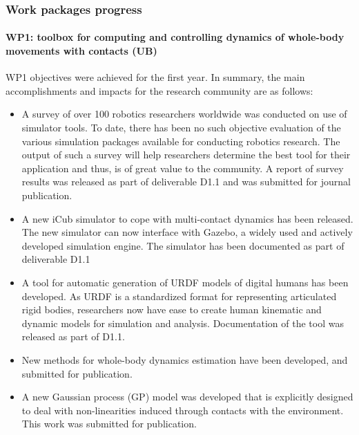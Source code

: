 \documentclass[12pt,a4paper,twoside]{article}
\begin{document}
\subsubsection{Work packages progress}

\paragraph*{WP1: toolbox for computing and controlling dynamics of whole-body movements with contacts (UB)}

WP1 objectives were achieved for the first year. In summary, the main accomplishments and impacts for the research community are as follows: 

\begin{itemize}

\item A survey of over 100 robotics researchers worldwide was conducted on use of simulator tools.  To date, there has been no such objective evaluation of the various simulation packages available for conducting robotics research. The output of such a survey will help researchers determine the best tool for their application and thus, is of great value to the community.  A report of survey results was released as part of deliverable D1.1 and was submitted for journal publication. 

\item A new iCub simulator to cope with multi-contact dynamics has been released. The new simulator can now interface with Gazebo, a widely used and actively developed simulation engine. The simulator has been documented as part of deliverable D1.1

\item A tool for automatic generation of URDF models of digital humans has been developed. As URDF is a standardized format for representing articulated rigid bodies, researchers  now have ease to create human kinematic and dynamic models for simulation and analysis. Documentation of the tool was released as part of D1.1. 

\item New methods for whole-body dynamics estimation have been developed, and submitted for publication. 

\item A new Gaussian process (GP) model was developed that is explicitly designed to deal with non-linearities induced through contacts with the environment. This work was submitted for publication. 
 
 \end{itemize}
 
\end{document}
